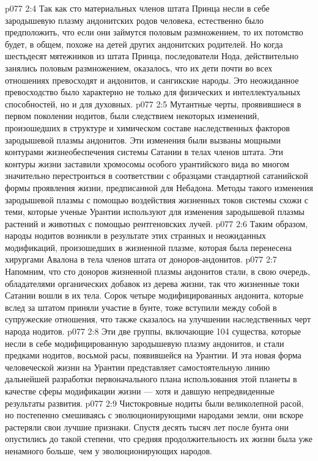 \vs p077 2:4 Так как сто материальных членов штата Принца несли в себе зародышевую плазму андонитских родов человека, естественно было предположить, что если они займутся половым размножением, то их потомство будет, в общем, похоже на детей других андонитских родителей. Но когда шестьдесят мятежников из штата Принца, последователи Нода, действительно занялись половым размножением, оказалось, что их дети почти во всех отношениях превосходят и андонитов, и сангикские народы. Это неожиданное превосходство было характерно не только для физических и интеллектуальных способностей, но и для духовных.
\vs p077 2:5 Мутантные черты, проявившиеся в первом поколении нодитов, были следствием некоторых изменений, произошедших в структуре и химическом составе наследственных факторов зародышевой плазмы андонитов. Эти изменения были вызваны мощными контурами жизнеобеспечения системы Сатании в телах членов штата. Эти контуры жизни заставили хромосомы особого урантийского вида во многом значительно перестроиться в соответствии с образцами стандартной сатанийской формы проявления жизни, предписанной для Небадона. Методы такого изменения зародышевой плазмы с помощью воздействия жизненных токов системы схожи с теми, которые ученые Урантии используют для изменения зародышевой плазмы растений и животных с помощью рентгеновских лучей.
\vs p077 2:6 Таким образом, народы нодитов возникли в результате этих странных и неожиданных модификаций, произошедших в жизненной плазме, которая была перенесена хирургами Авалона в тела членов штата от доноров\hyp{}андонитов.
\vs p077 2:7 \pc Напомним, что сто доноров жизненной плазмы андонитов стали, в свою очередь, обладателями органических добавок из дерева жизни, так что жизненные токи Сатании вошли в их тела. Сорок четыре модифицированных андонита, которые вслед за штатом приняли участие в бунте, тоже вступили между собой в супружеские отношения, что также сказалось на улучшении наследственных черт народа нодитов.
\vs p077 2:8 Эти две группы, включающие 104 существа, которые несли в себе модифицированную зародышевую плазму андонитов, и стали предками нодитов, восьмой расы, появившейся на Урантии. И эта новая форма человеческой жизни на Урантии представляет самостоятельную линию дальнейшей разработки первоначального плана использования этой планеты в качестве сферы модификации жизни --- хотя и давшую непредвиденные результаты развития.
\vs p077 2:9 \pc Чистокровные нодиты были великолепной расой, но постепенно смешиваясь с эволюционирующими народами земли, они вскоре растеряли свои лучшие признаки. Спустя десять тысяч лет после бунта они опустились до такой степени, что средняя продолжительность их жизни была уже ненамного больше, чем у эволюционирующих народов.
